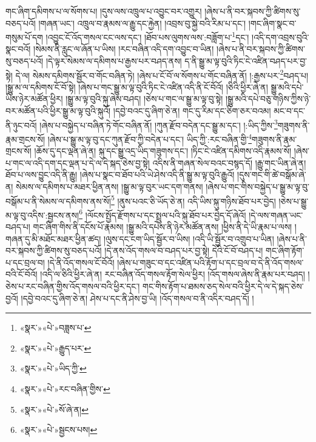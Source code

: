 གང་ཞིག་དམིགས་པ་ལ་སོགས་པ། །དུས་ལས་འཁྲུལ་པ་འབྱུང་བར་འགྱུར། །ཞེས་པ་ནི་བར་སྐབས་ཀྱི་ཚིགས་སུ་བཅད་པའོ། །གཞན་ཡང་། འཁྲུལ་བ་རྣམས་ལ་རྒྱུ་དང་རྐྱེན། །འབྲས་བུ་སྐྱེ་བའི་རིམ་པ་དང་། །གང་ཞིག་སྣང་བ་གསུམ་པོ་དག །འབྱུང་ངོ་འོད་གསལ་ངང་ལས་དང་། །ཐོབ་པས་ལུགས་ལས་:བཟློག་པ་\footnote{«སྣར་»«པེ་»བཟླས་པ་}དང་། །འདི་དག་འབྲས་བུའི་སྣང་བའོ། །སེམས་ནི་རླུང་ལ་ཞོན་པ་ཡིས། །རང་བཞིན་འདི་དག་འབྱུང་བ་ཡིན། །ཞེས་པ་ནི་བར་སྐབས་ཀྱི་ཚིགས་སུ་བཅད་པའོ། །དེ་ལྟར་སེམས་ལ་དམིགས་པ་རྒྱས་པར་བཤད་ནས། ད་ནི་སྒྱུ་མ་ལྟ་བུའི་ཏིང་ངེ་འཛིན་བཤད་པར་བྱ་སྟེ། དེ་ལ། སེམས་དམིགས་སྦྱོར་བ་གོང་བཞིན་ཏེ། །ཞེས་པ་ངོ་བོ་ལ་སོགས་པ་གོང་བཞིན་ནོ། །:རྒྱས་པར་\footnote{«སྣར་»«པེ་»རྒྱུད་པར་}བཤད་པ། །སྒྱུ་མ་ལ་དམིགས་ངོ་བོ་སྟེ། །ཞེས་པ་གང་སྒྱུ་མ་ལྟ་བུའི་ཏིང་ངེ་འཛིན་འདི་ནི་ངོ་བོའོ། །ཅིའི་ཕྱིར་ཞེ་ན། སྒྱུ་མའི་དཔེ་ཡིས་ཉེར་མཚོན་ཕྱིར། །སྒྱུ་མ་ལྟ་བུའི་སྐུ་ཞེས་བཤད། །ཅེས་པ་གང་ལ་སྒྱུ་མ་ལྟ་བུ་སྟེ། །སྒྱུ་མའི་དཔེ་བཅུ་གཉིས་ཀྱིས་ཉེ་བར་མཚོན་པའི་ཕྱིར་སྒྱུ་མ་ལྟ་བུའི་སྐུའོ། །དབྱེ་བའང་དུ་ཞིག་ཅེ་ན། གང་དུ་རིམ་དང་ཅིག་ཅར་བའམ། མང་བ་དང་ནི་ཉུང་བའོ། །ཞེས་པ་བསྐྱེད་པ་བཞིན་ཏེ་གོང་བཞིན་ནོ། །ཀུན་རྫོབ་བདེན་དང་སྒྱུ་མ་དང་། །:ཡིད་ཀྱིས་\footnote{«སྣར་»«པེ་»ཡིད་ཀྱི་}གཟུགས་ནི་རྣམ་གྲངས་སོ། །ཞེས་པ་སྒྱུ་མ་ལྟ་བུ་དང་ཀུན་རྫོབ་ཀྱི་བདེན་པ་དང་། ཡིད་ཀྱི་:རང་བཞིན་གྱི་\footnote{«སྣར་»«པེ་»རང་བཞིན་གྱིས་}གཟུགས་ནི་རྣམ་གྲངས་སོ། །ཆོས་དུ་དང་ལྡན་ཞེ་ན། སྐུ་དང་སྒྱུ་འདྲ་ཡིད་གཟུགས་དང་། །ཏིང་ངེ་འཛིན་དམིགས་འདི་རྣམས་སོ། །ཞེས་པ་གང་ལ་འདི་དག་དང་ལྡན་པ་དེ་ལ་དེ་སྐད་ཅེས་བྱ་སྟེ། འདིས་ནི་གཞན་སེལ་བའང་བསྙད་དོ། །རྒྱུ་གང་ཡིན་ཞེ་ན། ཐོབ་པ་ལས་བྱུང་འདི་ནི་རྒྱུ། །ཞེས་པ་སྣང་བ་ཐོབ་པའི་ཡེ་ཤེས་འདི་ནི་སྒྱུ་མ་ལྟ་བུའི་རྒྱུའོ། །དུས་གང་གི་ཚེ་བསྒོམ་ཞེ་ན། སེམས་ལ་དམིགས་པ་མཐར་ཕྱིན་ནས། །སྒྱུ་མ་ལྟ་བུར་ཡང་དག་གནས། །ཞེས་པ་གང་གིས་བསྐྱེད་པ་སྒྱུ་མ་ལྟ་བུ་བསྒོམ་པ་ནི་སེམས་ལ་དམིགས་ནས་སོ།\footnote{«སྣར་»«པེ་»སོ་ཞེ་ན།} །ནུས་པའང་ཅི་ཡོད་ཅེ་ན། འདི་ཡིས་སྐུ་གཉིས་ཐོབ་པར་བྱེད། །ཅེས་པ་སྒྱུ་མ་ལྟ་བུ་འདིས་:སྦྱངས་ནས།\footnote{«སྣར་»«པེ་»སྦྱངས་པས།} །ལོངས་སྤྱོད་རྫོགས་པ་དང་སྤྲུལ་པའི་སྐུ་ཐོབ་པར་བྱེད་དོ་ཞེའོ། །དེ་ལས་གཞན་ཡང་བཤད་པ། གང་ཞིག་གིས་ནི་དངོས་པོ་རྣམས། །སྒྱུ་མའི་དཔེས་ནི་ཉེར་མཚོན་ནས། །ཕྱིས་ནི་དེ་ཡི་རྣམ་པ་ལས། །གཞན་དུ་མི་མཐོང་མཐར་ཕྱིན་ཚད། །ལུས་དང་ངག་ཡིད་སྦྱོར་བ་ཡིས། །འདི་ཡི་སྦྱོར་བ་འགྲུབ་པ་ཡིན། །ཞེས་པ་ནི་བར་སྐབས་ཀྱི་ཚིགས་སུ་བཅད་པའོ། །དེ་ནས་འོད་གསལ་བ་བཤད་པར་བྱ་སྟེ། དེའི་ངོ་བོ་བཤད་པ། གང་ཞིག་རྟོག་པ་དང་བྲལ་བ། །དེ་ནི་འོད་གསལ་ངོ་བོའོ། །ཞེས་པ་གཟུང་བ་དང་འཛིན་པའི་རྟོག་པ་དང་བྲལ་བ་དེ་ནི་འོད་གསལ་བའི་ངོ་བོའོ། །འདི་ལ་ཅིའི་ཕྱིར་ཞེ་ན། རང་བཞིན་འོད་གསལ་རྟོག་སེལ་ཕྱིར། །འོད་གསལ་ཞེས་ནི་རྣམ་པར་བཤད། །ཅེས་པ་རང་བཞིན་གྱིས་འོད་གསལ་བའི་ཕྱིར་དང་། གང་གིས་རྟོག་པ་ཐམས་ཅད་སེལ་བའི་ཕྱིར་དེ་ལ་དེ་སྐད་ཅེས་བྱའོ། །དབྱེ་བའང་དུ་ཞིག་ཅེ་ན། ཤེས་པ་དང་ནི་ཤེས་བྱ་ཡི། །འོད་གསལ་བ་ནི་འདིར་བཤད་དོ། །

